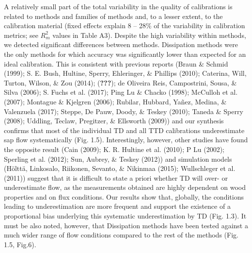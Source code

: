 \documentclass[11pt,twoside]{reedthesis}
\begin{document}
A relatively small part of the total variability in the quality of
calibrations is related to methods and families of methods and, to a
lesser extent, to the calibration material (fixed effects explain 8 --
28\% of the variability in calibration metrics; see \(R^2_m\) values in
Table A3). Despite the high variability within methods, we detected
significant differences between methods. Dissipation methods were the
only methods for which accuracy was significantly lower than expected
for an ideal calibration. This is consistent with previous reports
(Braun \& Schmid (1999); S. E. Bush, Hultine, Sperry, Ehleringer, \&
Phillips (2010); Caterina, Will, Turton, Wilson, \& Zou (2014);
({\textbf{???}}); de Oliveira Reis, Campostrini, Sousa, \& Silva (2006);
S. Fuchs et al. (2017); Ping Lu \& Chacko (1998); McCulloh et al.
(2007); Montague \& Kjelgren (2006); Rubilar, Hubbard, Yañez, Medina, \&
Valenzuela (2017); Steppe, De Pauw, Doody, \& Teskey (2010); Taneda \&
Sperry (2008); Uddling, Teclaw, Pregitzer, \& Ellsworth (2009)) and our
synthesis confirms that most of the individual TD and all TTD
calibrations underestimate sap flow systematically (Fig. 1.5).
Interestingly, however, other studies have found the opposite result
(Cain (2009); K. R. Hultine et al. (2010); P Lu (2002); Sperling et al.
(2012); Sun, Aubrey, \& Teskey (2012)) and simulation models (Hölttä,
Linkosalo, Riikonen, Sevanto, \& Nikinmaa (2015); Wullschleger et al.
(2011)) suggest that it is difficult to state a priori whether TD will
over- or underestimate flow, as the measurements obtained are highly
dependent on wood properties and on flux conditions. Our results show
that, globally, the conditions leading to underestimation are more
frequent and support the existence of a proportional bias underlying
this systematic underestimation by TD (Fig. 1.3). It must be also noted,
however, that Dissipation methods have been tested against a much wider
range of flow conditions compared to the rest of the methods (Fig. 1.5,
Fig.6).\par
\end{document}
